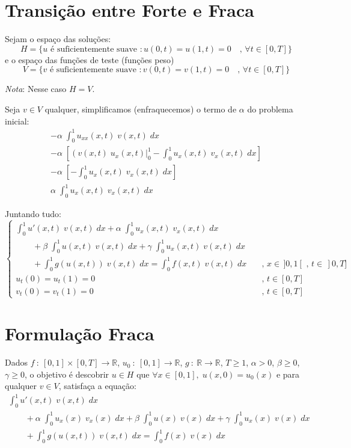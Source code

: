\documentclass[a4paper]{article}
\newcommand{\typ}{\::\:}
\begin{document}
\section{Transição entre Forte e Fraca}

Sejam o espaço das soluções:
\[
    H = \{
        u \text{ é suficientemente suave } : u(0, t) = u(1, t) = 0
        \quad\text{, } \forall t \in [0, T]
    \}
\]
e o espaço das funções de teste (funções peso)
\[
    V = \{
        v \text{ é suficientemente suave } : v(0, t) = v(1, t) = 0
        \quad\text{, } \forall t \in [0, T]
    \}
\]

\emph{Nota}: Nesse caso \(H = V\).

Seja \(v \in V\) qualquer,
simplificamos (enfraquecemos)
o termo de \(\alpha\)
do problema inicial:
\[ \begin{array}{l}
    - \alpha \; \int_0^1{ u_{xx}(x, t) \; v(x, t) \; dx }
    \\
    - \alpha \; \left[ \left( v(x, t) \; u_x(x, t) \right|_0^1 - \int_0^1{ u_x(x, t) \; v_x(x, t) \; dx } \right]
    \\
    - \alpha \; \left[ - \int_0^1{ u_x(x, t) \; v_x(x, t) \; dx } \right]
    \\
    \alpha \; \int_0^1{ u_x(x, t) \; v_x(x, t) \; dx }
\end{array} \]

Juntando tudo:
\[ \begin{cases}
    \int_0^1{ u'(x, t) \; v(x, t) \; dx}
    + \alpha \; \int_0^1{ u_x(x, t) \; v_x(x, t) \; dx}
    \\\qquad
    + \beta \; \int_0^1{ u(x, t) \; v(x, t) \; dx}
    + \gamma \; \int_0^1{ u_x(x, t) \; v(x, t) \; dx}
    \\\qquad
    + \int_0^1{ g(u(x, t)) \; v(x, t) \; dx}
    = \int_0^1{ f(x, t) \; v(x, t) \; dx}
        &\quad\text{, } x \in \,]0, 1[ \text{ , } t \in \,]0, T]
    \\
    u_t(0) = u_t(1) = 0
        &\quad\text{, } t \in [0, T]
    \\
    v_t(0) = v_t(1) = 0
        &\quad\text{, } t \in [0, T]
\end{cases} \]

\section{Formulação Fraca}

Dados
\(f \typ [0, 1] \times [0, T] \to \mathbb{R}\),
\(u_0 \typ [0, 1] \to \mathbb{R}\),
\(g \typ \mathbb{R} \to \mathbb{R}\),
\(T \ge 1\),
\(\alpha > 0\),
\(\beta \ge 0\),
\(\gamma \ge 0\),
o objetivo é descobrir \(u \in H\)
que \(\forall x \in [0, 1],\; u(x, 0) = u_0(x)\)
e para qualquer \(v \in V\),
satisfaça a equação:
\[ \begin{array}{l}
    \int_0^1{ u'(x, t) \; v(x, t) \; dx}
    \\\qquad
    + \alpha \; \int_0^1{ u_x(x) \; v_x(x) \; dx }
    + \beta \; \int_0^1{ u(x) \; v(x) \; dx }
    + \gamma \; \int_0^1{ u_x(x) \; v(x) \; dx}
    \\\qquad
    + \int_0^1{ g(u(x, t)) \; v(x, t) \; dx}
    = \int_0^1{ f(x) \; v(x) \; dx }
\end{array} \]
\end{document}
